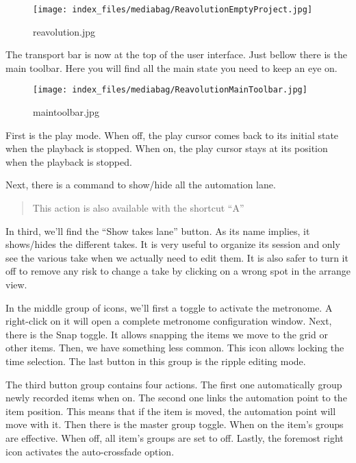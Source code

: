 \documentclass[
  letterpaper,
  DIV=11,
  numbers=noendperiod]{scrreport}
\begin{document}
\begin{figure}

{\centering \texttt{[image: index\_files/mediabag/ReavolutionEmptyProject.jpg]}

}

\caption{reavolution.jpg}

\end{figure}

The transport bar is now at the top of the user interface. Just bellow
there is the main toolbar. Here you will find all the main state you
need to keep an eye on.

\begin{figure}

{\centering \texttt{[image: index\_files/mediabag/ReavolutionMainToolbar.jpg]}

}

\caption{maintoolbar.jpg}

\end{figure}

First is the play mode. When off, the play cursor comes back to its
initial state when the playback is stopped. When on, the play cursor
stays at its position when the playback is stopped.

Next, there is a command to show/hide all the automation lane.

\begin{quote}
This action is also available with the shortcut ``A''
\end{quote}

In third, we'll find the ``Show takes lane'' button. As its name
implies, it shows/hides the different takes. It is very useful to
organize its session and only see the various take when we actually need
to edit them. It is also safer to turn it off to remove any risk to
change a take by clicking on a wrong spot in the arrange view.

In the middle group of icons, we'll first a toggle to activate the
metronome. A right-click on it will open a complete metronome
configuration window. Next, there is the Snap toggle. It allows snapping
the items we move to the grid or other items. Then, we have something
less common. This icon allows locking the time selection. The last
button in this group is the ripple editing mode.

The third button group contains four actions. The first one
automatically group newly recorded items when on. The second one links
the automation point to the item position. This means that if the item
is moved, the automation point will move with it. Then there is the
master group toggle. When on the item's groups are effective. When off,
all item's groups are set to off. Lastly, the foremost right icon
activates the auto-crossfade option.
\end{document}
